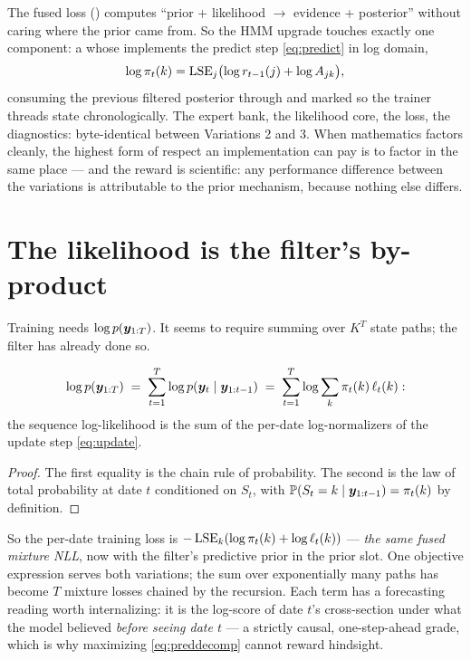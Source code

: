 \begin{engineering}
The fused loss () computes ``prior + likelihood
$\to$ evidence + posterior'' without caring where the prior came from.
So the HMM upgrade touches exactly one component: a
 whose  implements the predict step
\eqref{eq:predict} in log domain,
\[
  \log \pi_t(k) = \operatorname{LSE}_j\bigl(\log r_{t-1}(j) + \log A_{jk}\bigr),
\]
consuming the previous filtered posterior through
 and marked  so
the trainer threads state chronologically. The expert bank, the
likelihood core, the loss, the diagnostics: byte-identical between
Variations 2 and 3. When mathematics factors cleanly, the highest form
of respect an implementation can pay is to factor in the same place ---
and the reward is scientific: any performance difference between the
variations is attributable to the prior mechanism, because nothing else
differs.
\end{engineering}

\section{The likelihood is the filter's by-product}
\label{sec:predictionerror}

Training needs $\log p(\bm{y}_{1:T})$. It seems to require summing over
$K^T$ state paths; the filter has already done so.

\begin{proposition}\label{prop:preddecomp}
\begin{equation}\label{eq:preddecomp}
  \log p(\bm{y}_{1:T})
  \;=\; \sum_{t=1}^{T} \log p(\bm{y}_t \mid \bm{y}_{1:t-1})
  \;=\; \sum_{t=1}^{T} \log \sum_k \pi_t(k)\, \ell_t(k):
\end{equation}
the sequence log-likelihood is the sum of the per-date log-normalizers of
the update step \eqref{eq:update}.
\end{proposition}

\begin{proof}
The first equality is the chain rule of probability. The second is the
law of total probability at date $t$ conditioned on $S_t$, with
$\mathbb{P}(S_t = k \mid \bm{y}_{1:t-1}) = \pi_t(k)$ by definition.
\end{proof}

So the per-date training loss is $-\operatorname{LSE}_k(\log \pi_t(k) + \log
\ell_t(k))$ --- \emph{the same fused mixture NLL}, now with the filter's
predictive prior in the prior slot. One objective expression serves both
variations; the sum over exponentially many paths has become $T$
mixture losses chained by the recursion. Each term has a forecasting
reading worth internalizing: it is the log-score of date $t$'s
cross-section under what the model believed \emph{before seeing date
$t$} --- a strictly causal, one-step-ahead grade, which is why
maximizing \eqref{eq:preddecomp} cannot reward hindsight.

